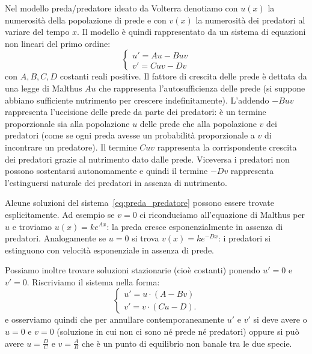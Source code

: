 Nel modello preda/predatore ideato da Volterra denotiamo con $u(x)$ 
la numerosità della popolazione di prede e con $v(x)$ la numerosità 
dei predatori al variare del tempo $x$.
Il modello è quindi rappresentato da un sistema di equazioni
non lineari del primo ordine:
\begin{equation}\label{eq:preda_predatore}
  \begin{cases}
    u' = A u - B u v \\
    v' = C u v - D v
  \end{cases}
\end{equation}
con $A,B,C,D$ costanti reali positive.
Il fattore di crescita delle prede è dettata da una legge di Malthus
$A u$ che rappresenta l'autosufficienza delle prede (si suppone 
abbiano sufficiente nutrimento per crescere indefinitamente).
L'addendo $-B u v$ rappresenta l'uccisione delle prede 
da parte dei predatori: è un termine proporzionale sia alla popolazione 
$u$ delle prede che alla popolazione $v$ dei predatori (come se ogni preda 
avesse un probabilità proporzionale a $v$ di incontrare un predatore).
Il termine $C u v$ rappresenta la corrispondente 
crescita dei predatori grazie al nutrimento dato dalle prede.
Viceversa i predatori non possono sostentarsi autonomamente e quindi 
il termine $-D v$ rappresenta l'estinguersi naturale dei predatori 
in assenza di nutrimento.

Alcune soluzioni del sistema~\eqref{eq:preda_predatore} possono essere 
trovate esplicitamente. 
Ad esempio se $v=0$ ci riconduciamo all'equazione di Malthus per $u$ 
e troviamo $u(x) = k e^{Ax}$: la preda cresce esponenzialmente in 
assenza di predatori.
Analogamente se $u=0$ si trova $v(x) = k e^{-Dx}$: i predatori 
si estinguono con velocità esponenziale in assenza di prede.


Possiamo inoltre trovare soluzioni stazionarie (cioè costanti) ponendo 
$u'=0$ e $v'=0$. Riscriviamo il sistema nella forma:
\begin{equation}\label{eq:preda_predatore_2}
  \begin{cases}
    u' = u \cdot (A - B v) \\
    v' = v \cdot (C u - D).
  \end{cases}
\end{equation}
e osserviamo quindi che per annullare contemporaneamente $u'$ e $v'$ 
si deve avere o $u=0$ e $v=0$ (soluzione in cui non ci sono né prede né predatori)
oppure si può avere $u=\frac D C$ e $v=\frac A B$ che è un punto di equilibrio
non banale tra le due specie.

